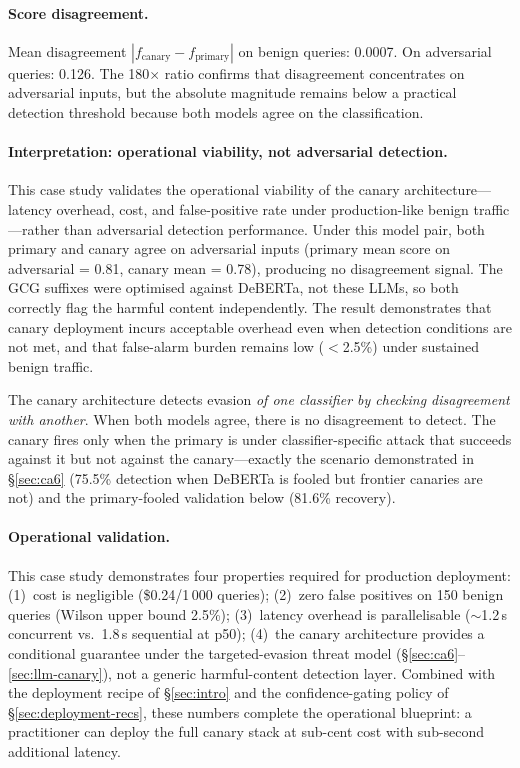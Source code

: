 \paragraph{Score disagreement.} Mean disagreement $|f_{\text{canary}} - f_{\text{primary}}|$ on benign queries: 0.0007. On adversarial queries: 0.126. The 180$\times$ ratio confirms that disagreement concentrates on adversarial inputs, but the absolute magnitude remains below a practical detection threshold because both models agree on the classification.

\paragraph{Interpretation: operational viability, not adversarial detection.} This case study validates the operational viability of the canary architecture---latency overhead, cost, and false-positive rate under production-like benign traffic---rather than adversarial detection performance. Under this model pair, both primary and canary agree on adversarial inputs (primary mean score on adversarial = 0.81, canary mean = 0.78), producing no disagreement signal. The GCG suffixes were optimised against DeBERTa, not these LLMs, so both correctly flag the harmful content independently. The result demonstrates that canary deployment incurs acceptable overhead even when detection conditions are not met, and that false-alarm burden remains low ($<$2.5\%) under sustained benign traffic.

The canary architecture detects evasion \emph{of one classifier by checking disagreement with another}. When both models agree, there is no disagreement to detect. The canary fires only when the primary is under classifier-specific attack that succeeds against it but not against the canary---exactly the scenario demonstrated in \S\ref{sec:ca6} (75.5\% detection when DeBERTa is fooled but frontier canaries are not) and the primary-fooled validation below (81.6\% recovery).

\paragraph{Operational validation.} This case study demonstrates four properties required for production deployment: (1)~cost is negligible (\$0.24/1\,000 queries); (2)~zero false positives on 150 benign queries (Wilson upper bound 2.5\%); (3)~latency overhead is parallelisable (${\sim}$1.2\,s concurrent vs.\ 1.8\,s sequential at p50); (4)~the canary architecture provides a conditional guarantee under the targeted-evasion threat model (\S\ref{sec:ca6}--\ref{sec:llm-canary}), not a generic harmful-content detection layer. Combined with the deployment recipe of \S\ref{sec:intro} and the confidence-gating policy of \S\ref{sec:deployment-recs}, these numbers complete the operational blueprint: a practitioner can deploy the full canary stack at sub-cent cost with sub-second additional latency.


